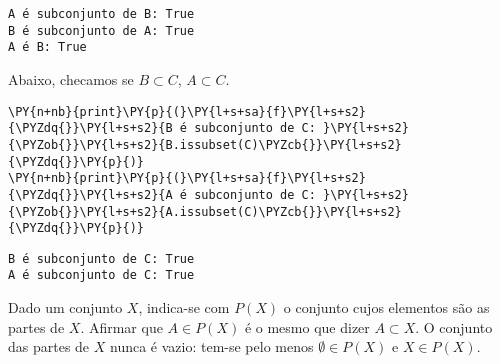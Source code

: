 \documentclass{book}
\begin{document}
\begin{exemplo}
\begin{Verbatim}[commandchars=\\\{\},frame=leftline,fontsize=\small, xleftmargin=0.5em]
A é subconjunto de B: True
B é subconjunto de A: True
A é B: True
\end{Verbatim}

            Abaixo, checamos se $B \subset C$, $A \subset C$.


\begin{Verbatim}[commandchars=\\\{\},frame=single,fontsize=\small, xleftmargin=0.5em]
\PY{n+nb}{print}\PY{p}{(}\PY{l+s+sa}{f}\PY{l+s+s2}{\PYZdq{}}\PY{l+s+s2}{B é subconjunto de C: }\PY{l+s+s2}{\PYZob{}}\PY{l+s+s2}{B.issubset(C)\PYZcb{}}\PY{l+s+s2}{\PYZdq{}}\PY{p}{)}
\PY{n+nb}{print}\PY{p}{(}\PY{l+s+sa}{f}\PY{l+s+s2}{\PYZdq{}}\PY{l+s+s2}{A é subconjunto de C: }\PY{l+s+s2}{\PYZob{}}\PY{l+s+s2}{A.issubset(C)\PYZcb{}}\PY{l+s+s2}{\PYZdq{}}\PY{p}{)}
\end{Verbatim}

\begin{Verbatim}[commandchars=\\\{\},frame=leftline,fontsize=\small, xleftmargin=0.5em]
B é subconjunto de C: True
A é subconjunto de C: True
\end{Verbatim}

        \end{exemplo}

        Dado um conjunto $X$, indica-se com $P \left( X \right)$ o conjunto cujos elementos são as partes de $X$. Afirmar que $A \in P \left( X \right)$ é o mesmo que dizer $A \subset X$. O conjunto das partes de $X$ nunca é vazio: tem-se pelo menos $\emptyset \in P \left( X \right)$ e $X \in P \left( X \right)$.
\end{document}
